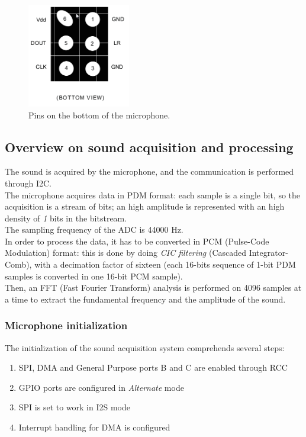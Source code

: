 \begin{figure}[H]
	\hspace*{0.3 \textwidth}\includegraphics[width= 0.4\textwidth]
	{files/images/mic_bottom_pins}
	\caption{Pins on the bottom of the microphone.}
\end{figure}

\subsection{Overview on sound acquisition and processing}
The sound is acquired by the microphone, and the communication is performed through I2C.\\
The microphone acquires data in PDM format: each sample is a single bit, so the acquisition is a stream of bits; an high amplitude is represented with an high density of \textit{1} bits in the bitstream. \\
The sampling frequency of the ADC is 44000 Hz. \\
In order to process the data, it has to be converted in PCM (Pulse-Code Modulation) format: this is done by doing \textit{CIC filtering} (Cascaded Integrator-Comb), with a decimation factor of sixteen (each 16-bits sequence of 1-bit PDM samples is converted in one 16-bit PCM sample).\\
Then, an FFT (Fast Fourier Transform) analysis is performed on 4096 samples at a time to extract the fundamental frequency and the amplitude of the sound.

\subsubsection{Microphone initialization}
The initialization of the sound acquisition system comprehends several steps:
\begin{enumerate}
	\item SPI, DMA and General Purpose ports B and C are enabled through RCC
	\item GPIO ports are configured in \textit{Alternate} mode
	\item SPI is set to work in I2S mode
	\item Interrupt handling for DMA is configured
	
\end{enumerate}

